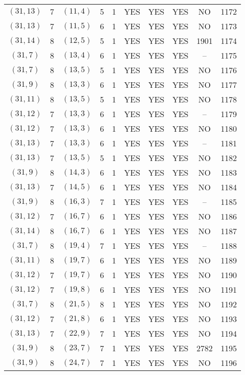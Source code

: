 \begin{longtable}{|c|c|c|c|c|c|c|c|c|c|}
$(31, 13)$ & 7 & $(11, 4)$ & 5 & 1 & YES & YES & YES & NO & 1172\\
$(31, 13)$ & 7 & $(11, 5)$ & 6 & 1 & YES & YES & YES & NO & 1173\\
$(31, 14)$ & 8 & $(12, 5)$ & 5 & 1 & YES & YES & YES & 1901 & 1174\\
$(31, 7)$ & 8 & $(13, 4)$ & 6 & 1 & YES & YES & YES & -- & 1175\\
$(31, 7)$ & 8 & $(13, 5)$ & 5 & 1 & YES & YES & YES & NO & 1176\\
$(31, 9)$ & 8 & $(13, 3)$ & 6 & 1 & YES & YES & YES & NO & 1177\\
$(31, 11)$ & 8 & $(13, 5)$ & 5 & 1 & YES & YES & YES & NO & 1178\\
$(31, 12)$ & 7 & $(13, 3)$ & 6 & 1 & YES & YES & YES & -- & 1179\\
$(31, 12)$ & 7 & $(13, 3)$ & 6 & 1 & YES & YES & YES & NO & 1180\\
$(31, 13)$ & 7 & $(13, 3)$ & 6 & 1 & YES & YES & YES & -- & 1181\\
$(31, 13)$ & 7 & $(13, 5)$ & 5 & 1 & YES & YES & YES & NO & 1182\\
$(31, 9)$ & 8 & $(14, 3)$ & 6 & 1 & YES & YES & YES & NO & 1183\\
$(31, 13)$ & 7 & $(14, 5)$ & 6 & 1 & YES & YES & YES & NO & 1184\\
$(31, 9)$ & 8 & $(16, 3)$ & 7 & 1 & YES & YES & YES & -- & 1185\\
$(31, 12)$ & 7 & $(16, 7)$ & 6 & 1 & YES & YES & YES & NO & 1186\\
$(31, 14)$ & 8 & $(16, 7)$ & 6 & 1 & YES & YES & YES & NO & 1187\\
$(31, 7)$ & 8 & $(19, 4)$ & 7 & 1 & YES & YES & YES & -- & 1188\\
$(31, 11)$ & 8 & $(19, 7)$ & 6 & 1 & YES & YES & YES & NO & 1189\\
$(31, 12)$ & 7 & $(19, 7)$ & 6 & 1 & YES & YES & YES & NO & 1190\\
$(31, 12)$ & 7 & $(19, 8)$ & 6 & 1 & YES & YES & YES & NO & 1191\\
$(31, 7)$ & 8 & $(21, 5)$ & 8 & 1 & YES & YES & YES & NO & 1192\\
$(31, 12)$ & 7 & $(21, 8)$ & 6 & 1 & YES & YES & YES & NO & 1193\\
$(31, 13)$ & 7 & $(22, 9)$ & 7 & 1 & YES & YES & YES & NO & 1194\\
$(31, 9)$ & 8 & $(23, 7)$ & 7 & 1 & YES & YES & YES & 2782 & 1195\\
$(31, 9)$ & 8 & $(24, 7)$ & 7 & 1 & YES & YES & YES & NO & 1196\\

\end{longtable}
